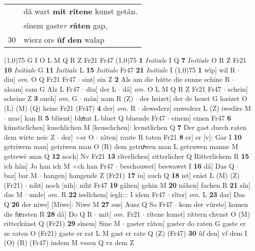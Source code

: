 \documentclass[8pt,a4paper,notitlepage]{article}
\begin{document}
\begin{table}[ht]
\begin{minipage}[t]{0.5\linewidth}
\begin{tabular}{rl}
 & dâ wart \textbf{mit rîtene} kunst getân.\\ 
 & sînem gaste\textit{r} \textbf{\textit{r}âten} gap,\\ 
30 & wierz ors \textbf{ûf den} walap\\ 
\end{tabular}
\scriptsize
\line(1,0){75} \newline
G I O L M Q R Z Fr21 Fr47 \newline
\line(1,0){75} \newline
\textbf{1} \textit{Initiale} I Q  \textbf{7} \textit{Initiale} O R Z Fr21  \textbf{10} \textit{Initiale} G  \textbf{11} \textit{Initiale} L  \textbf{15} \textit{Initiale} Fr47  \textbf{21} \textit{Initiale} I  \newline
\line(1,0){75} \newline
\textbf{1} wîp] wil R  $\cdot$ diu] \textit{om.} O Q Fr21 Fr47  $\cdot$ sint] sin Z \textbf{2} Als am die hútte die sunne schine R  $\cdot$ alsam] sam G Alz L Fr47  $\cdot$ diu] der L  $\cdot$ dâ] \textit{om.} O L M Q R Z Fr21 Fr47  $\cdot$ schein] scheine Z \textbf{3} ouch] \textit{om.} G  $\cdot$ mân] nam R (Z)  $\cdot$ der heizet] der de hezet G hæizet O (L) (M) (Q) heize Fr21 (Fr47) \textbf{4} der] \textit{om.} R  $\cdot$ dewederz] enwederz L (Z) iwedirs M  $\cdot$ mac] kan R \textbf{5} blüent] bluͯmt L bluet Q bluende Fr47  $\cdot$ einem] einen Fr47 \textbf{6} künsticlîchen] kuschlichen M [keuschchen]: kvnstlichen Q \textbf{7} Der gast durch raten dem wirte neic Z  $\cdot$ der] ÷er O  $\cdot$ râten] raute R taten Fr21 \textbf{8} er] er [v]: Gar I \textbf{10} getriwem man] getriwen man O (R) dem getruͯwen man L getruwen manne M getrewē man Q \textbf{12} noch] Nv Fr21 \textbf{13} rîterlîchen] ritterlicher Q Ritterlichem R \textbf{15} ich hân] Jo han ich M ÷ch han Fr47  $\cdot$ beschouwet] beswawet I \textbf{16} dâ] Das Q  $\cdot$ baz] bar M  $\cdot$ hangen] hangende Z (Fr21) \textbf{17} iu] auch Q \textbf{18} ist] enist L (M) (Z) (Fr21)  $\cdot$ niht] noch [nih]: niht Fr47 \textbf{19} gâhen] gehin M \textbf{20} nâhen] fachen R \textbf{21} sîn] das M  $\cdot$ unde] \textit{om.} R \textbf{22} ieslîchem] iegli::: I idem Fr47  $\cdot$ rîter] \textit{om.} L \textbf{23} dar] Das Q \textbf{26} der niwe] [Miwe]: Niwe M \textbf{27} sus] Ausz Q So Fr47  $\cdot$ kom der vürste] komen die fᵫrsten R \textbf{28} dâ] Do Q R  $\cdot$ mit] \textit{om.} Fr21  $\cdot$ rîtene kunst] rittern chvnst O (M) ritterkúnst Q (Fr21) \textbf{29} sînem] Sine M  $\cdot$ gaster râten] gaster do raten G gaste er ze raten O (Fr21) gaste er rat L M gast er rate Q (Z) (Fr47) \textbf{30} ûf den] vf dem I (O) (R) (Fr47) indem M vssen Q vz dem Z \newline

\end{minipage}
\end{table}
\end{document}
